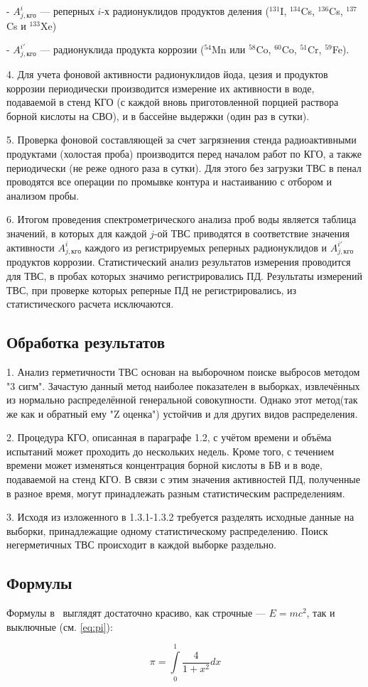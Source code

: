- $A_{j,кго}^{i}$ --- реперных $i$-х радионуклидов продуктов деления ($^{131}$I, $^{134}$Cs, $^{136}$Cs, $^{137}$Cs и $^{133}$Xe)

- $A_{j,кго}^{i'}$ --- радионуклида продукта коррозии ($^{54}$Mn или $^{58}$Co, $^{60}$Co, $^{51}$Cr, $^{59}$Fe).

4. Для учета фоновой активности радионуклидов йода, цезия и
продуктов коррозии периодически производится измерение их активности
в воде, подаваемой в стенд КГО (с каждой вновь приготовленной порцией
раствора борной кислоты на СВО), и в бассейне выдержки (один раз в
сутки).

5. Проверка фоновой составляющей за счет загрязнения стенда
радиоактивными продуктами (холостая проба) производится перед началом
работ по КГО, а также периодически (не реже одного раза в сутки). Для этого
без загрузки ТВС в пенал проводятся все операции по промывке контура и
настаиванию с отбором и анализом пробы.

6. Итогом проведения спектрометрического анализа проб воды является
таблица значений, в которых для каждой $j$-ой ТВС приводятся в соответствие
значения активности $A_{j,кго}^{i}$ каждого из регистрируемых реперных радионуклидов
и $A_{j,кго}^{i'}$ продуктов коррозии. Статистический анализ результатов
измерения проводится для ТВС, в пробах которых значимо регистрировались
ПД. Результаты измерений ТВС, при проверке которых реперные ПД не
регистрировались, из статистического расчета исключаются.

\subsection{Обработка результатов}
1. Анализ герметичности ТВС основан на выборочном поиске выбросов методом "3 сигм". Зачастую данный метод наиболее показателен в выборках, извлечённых из нормально распределённой генеральной совокупности. Однако этот метод(так же как и обратный ему "Z оценка") устойчив и для других видов распределения.

2. Процедура КГО, описанная в параграфе 1.2, с учётом времени и объёма испытаний может проходить до нескольких недель. Кроме того, с течением времени может изменяться концентрация борной кислоты в БВ и в воде, подаваемой на стенд КГО. В связи с этим значения активностей ПД, полученные в разное время, могут принадлежать разным статистическим распределениям.

3. Исходя из изложенного в 1.3.1-1.3.2 требуется разделять исходные данные на выборки, принадлежащие одному статистическому распределению. Поиск негерметичных ТВС происходит в каждой выборке раздельно. 

\subsection{Формулы}

Формулы в \LaTeXe\ выглядят достаточно красиво, как строчные --- $E=mc^2$, так и выключные (см. \ref{eq:pi}):

\begin{equation} \label{eq:pi}
\pi = \int\limits_0^1 \frac{4}{1+x^2} dx
\end{equation}